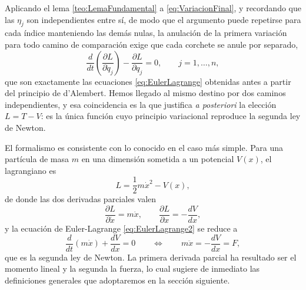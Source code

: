        Aplicando el lema \ref{teo:LemaFundamental} a \eqref{eq:VariacionFinal}, y recordando que las $\eta_{j}$ son independientes entre sí, de modo que el argumento puede repetirse para cada índice manteniendo las demás nulas, la anulación de la primera variación para todo camino de comparación exige que cada corchete se anule por separado,
        \begin{equation}\label{eq:EulerLagrange2}
            \boxed{\;\frac{d}{dt}\left(\frac{\partial L}{\partial\dot{q}_{j}}\right) - \frac{\partial L}{\partial q_{j}} = 0, \qquad j = 1,\ldots,n,\;}
        \end{equation}
        que son exactamente las ecuaciones \eqref{eq:EulerLagrange} obtenidas antes a partir del principio de d'Alembert. Hemos llegado al mismo destino por dos caminos independientes, y esa coincidencia es la que justifica \textit{a posteriori} la elección $L = T-V$: es la única función cuyo principio variacional reproduce la segunda ley de Newton.

        El formalismo es consistente con lo conocido en el caso más simple. Para una partícula de masa $m$ en una dimensión sometida a un potencial $V(x)$, el lagrangiano es
        \begin{equation}\label{eq:LagrangianoParticula}
            L = \frac{1}{2}m\dot{x}^{2} - V(x),
        \end{equation}
        de donde las dos derivadas parciales valen
        \begin{equation}\label{eq:DerivadasParticula}
            \frac{\partial L}{\partial\dot{x}} = m\dot{x}, \qquad \frac{\partial L}{\partial x} = -\frac{dV}{dx},
        \end{equation}
        y la ecuación de Euler-Lagrange \eqref{eq:EulerLagrange2} se reduce a
        \begin{equation}\label{eq:NewtonRecuperada}
            \frac{d}{dt}\left(m\dot{x}\right) + \frac{dV}{dx} = 0
            \qquad\Longleftrightarrow\qquad
            m\ddot{x} = -\frac{dV}{dx} = F,
        \end{equation}
        que es la segunda ley de Newton. La primera derivada parcial ha resultado ser el momento lineal y la segunda la fuerza, lo cual sugiere de inmediato las definiciones generales que adoptaremos en la sección siguiente.

